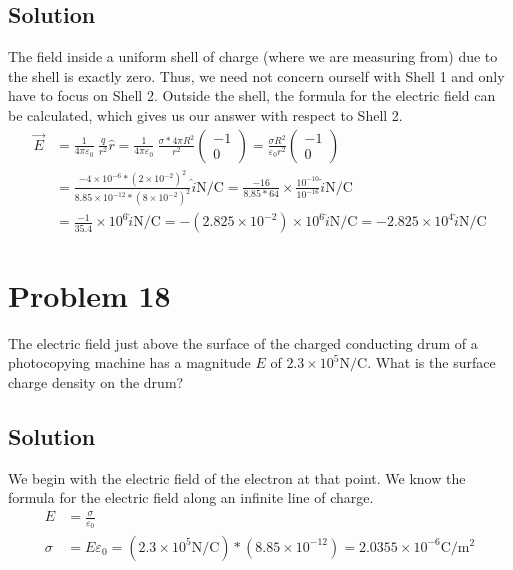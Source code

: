 \documentclass[12pt]{article}
\begin{document}
\subsection*{Solution}
The field inside a uniform shell of charge (where we are measuring from) due to the shell is exactly zero. Thus, we need not concern ourself with Shell 1 and only have to focus on Shell 2. Outside the shell, the formula for the electric field can be calculated, which gives us our answer with respect to Shell 2.
\begin{align*}
    \vec{E} &=  \frac{1}{4\pi\varepsilon_0}\ \frac{q}{r^2} \hat{r}
        =   \frac{1}{4\pi\varepsilon_0}\ \frac{\sigma*4\pi R^2}{r^2} \begin{pmatrix} -1 \\ 0 \end{pmatrix}
        =   \frac{\sigma R^2}{\varepsilon_0 r^2} \begin{pmatrix} -1 \\ 0 \end{pmatrix}\\
        &=  \frac{-4 \times 10^{-6} * (2 \times 10^{-2})^2}{8.85 \times 10^{-12} * (8 \times 10^{-2})^2}\hat{i} \unit{\newton/\coulomb}
        =   \frac{-16}{8.85 * 64} \times \frac{10^{-10}}{10^{-16}}\hat{i} \unit{\newton/\coulomb}\\
        &=  \frac{-1}{35.4} \times 10^{6}\hat{i} \unit{\newton/\coulomb}
        =   -(2.825 \times 10^{-2}) \times 10^{6}\hat{i} \unit{\newton/\coulomb}
        =   \boxed{-2.825 \times 10^4 \hat{i} \unit{\newton/\coulomb}}
\end{align*}

\pagebreak
\section{Problem 18}
The electric field just above the surface of the charged conducting drum of a photocopying machine has a magnitude $E$ of $2.3 \times 10^5 \unit{\newton/\coulomb}$. What is the surface charge density on the drum?

\subsection*{Solution}
We begin with the electric field of the electron at that point. We know the formula for the electric field along an infinite line of charge.
\begin{align*}
    E   &=  \frac{\sigma}{\varepsilon_0}\\
    \sigma  &=  E\varepsilon_0
        =   (2.3 \times 10^5 \unit{\newton/\coulomb})*(8.85 \times 10^{-12})
        =   \boxed{2.0355 \times 10^{-6} \unit{\coulomb/\meter^2}}
\end{align*}
\end{document}
